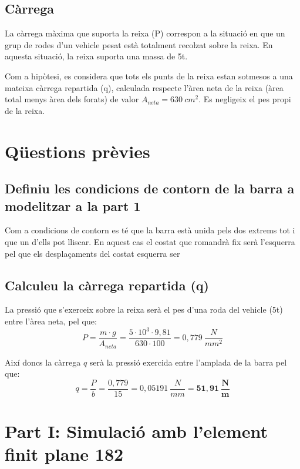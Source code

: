 \documentclass[a4paper]{article}
\begin{document}
\subsection{Càrrega}
La càrrega màxima que suporta la reixa (P) correspon a la situació en que un grup de rodes d'un vehicle pesat està totalment recolzat sobre la reixa. En aquesta situació, la reixa suporta una massa de 5t.

Com a hipòtesi, es considera que tots els punts de la reixa estan sotmesos a una mateixa càrrega repartida (q), calculada respecte l'àrea neta de la reixa (àrea total menys àrea dels forats) de valor $A_{neta} = 630 \ cm^2$. Es negligeix el pes propi de la reixa.

\section{Qüestions prèvies}
\subsection{Definiu les condicions de contorn de la barra a modelitzar a la part 1}

Com a condicions de contorn es té que la barra està unida pels dos extrems tot i que un d'ells pot lliscar. En aquest cas el costat que romandrà fix serà l'esquerra pel que els desplaçaments del costat esquerra ser

\subsection{Calculeu la càrrega repartida (q)}

La pressió que s'exerceix sobre la reixa serà el pes d'una roda del vehicle (5t) entre l'àrea neta, pel que:
$$
P = \frac{m \cdot g}{A_{neta}} = \frac{5\cdot10^3 \cdot 9,81}{630 \cdot 100} = 0,779\ \frac{N}{mm^2}
$$

Així doncs la càrrega $q$ serà la pressió exercida entre l'amplada de la barra pel que:
$$
q = \frac{P}{b} = \frac{0,779}{15} = 0,05191\ \frac{N}{mm} = \boldsymbol{51,91 \ \frac{N}{m}}
$$

\section{Part I: Simulació amb l'element finit plane 182}
\end{document}
